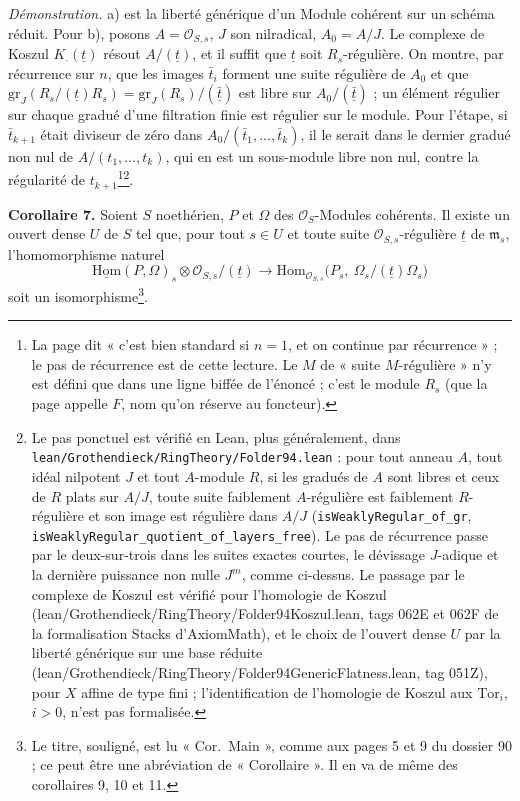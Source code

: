 \documentclass[11pt,a4paper]{article}
\begin{document}
\emph{Démonstration.} a) est la liberté générique d'un Module cohérent sur un
schéma réduit. Pour b), posons $A = \mathcal{O}_{S,s}$, $J$ son nilradical,
$A_0 = A/J$. Le complexe de Koszul $K_{\cdot}(\underline{t})$ résout
$A/(\underline{t})$, et il suffit que $\underline{t}$ soit $R_s$-régulière.
On montre, par récurrence sur $n$, que les images $\bar{t}_i$ forment une suite
régulière de $A_0$ et que $\mathrm{gr}_J(R_s/(\underline{t})R_s) =
\mathrm{gr}_J(R_s)/(\bar{\underline{t}})$ est libre sur
$A_0/(\bar{\underline{t}})$ ; un élément régulier sur chaque gradué d'une
filtration finie est régulier sur le module. Pour l'étape, si $\bar{t}_{k+1}$
était diviseur de zéro dans $A_0/(\bar{t}_1, \ldots, \bar{t}_k)$, il le serait
dans le dernier gradué non nul de $A/(t_1, \ldots, t_k)$, qui en est un
sous-module libre non nul, contre la régularité de $t_{k+1}$\footnote{La page
dit « c'est bien standard si $n = 1$, et on continue par récurrence » ; le
pas de récurrence est de cette lecture. Le $M$ de « suite $M$-régulière » n'y
est défini que dans une ligne biffée de l'énoncé ; c'est le module $R_s$ (que
la page appelle $F$, nom qu'on réserve au foncteur).}\footnote{Le pas
ponctuel est vérifié en Lean, plus généralement, dans
\texttt{lean/Grothendieck/RingTheory/Folder94.lean} : pour tout anneau $A$, tout idéal
nilpotent $J$ et tout $A$-module $R$, si les gradués de $A$ sont libres et ceux
de $R$ plats sur $A/J$, toute suite faiblement $A$-régulière est faiblement
$R$-régulière et son image est régulière dans $A/J$
(\texttt{isWeaklyRegular\_of\_gr},
\texttt{isWeaklyRegular\_quotient\_of\_layers\_free}). Le pas de récurrence
passe par le deux-sur-trois dans les suites exactes courtes, le dévissage
$J$-adique et la dernière puissance non nulle $J^m$, comme ci-dessus. Le passage
par le complexe de Koszul est vérifié pour l'homologie de Koszul
(lean/Grothendieck/RingTheory/Folder94Koszul.lean, tags 062E et 062F de la formalisation
Stacks d'AxiomMath), et le choix de l'ouvert dense $U$ par la liberté générique
sur une base réduite (lean/Grothendieck/RingTheory/Folder94GenericFlatness.lean, tag
051Z), pour $X$ affine de type fini ; l'identification de l'homologie de
Koszul aux $\mathrm{Tor}_i$, $i > 0$, n'est pas formalisée.}.

\textbf{Corollaire 7.} Soient $S$ noethérien, $P$ et $\Omega$ des
$\mathcal{O}_S$-Modules cohérents. Il existe un ouvert dense $U$ de $S$ tel que,
pour tout $s \in U$ et toute suite $\mathcal{O}_{S,s}$-régulière
$\underline{t}$ de $\mathfrak{m}_s$, l'homomorphisme naturel
\[
  \underline{\mathrm{Hom}}(P, \Omega)_s \otimes \mathcal{O}_{S,s}/(\underline{t})
  \longrightarrow
  \mathrm{Hom}_{\mathcal{O}_{S,s}}\bigl(P_s,\ \Omega_s/(\underline{t})\Omega_s\bigr)
\]
soit un isomorphisme\footnote{Le titre, souligné, est lu « Cor.\ Main »,
comme aux pages 5 et 9 du dossier 90 ; ce peut être une abréviation de
« Corollaire ». Il en va de même des corollaires 9, 10 et 11.}.
\end{document}
